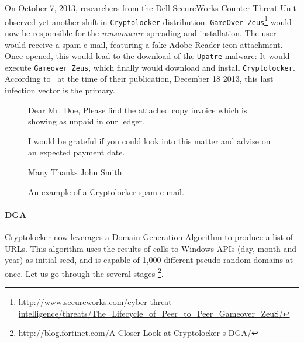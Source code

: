 On October 7, 2013, researchers from the Dell SecureWorks Counter Threat
Unit observed yet another shift in \texttt{Cryptolocker} distribution.
\texttt{GameOver Zeus}\footnote{\url{http://www.secureworks.com/cyber-threat-intelligence/threats/The_Lifecycle_of_Peer_to_Peer_Gameover_ZeuS/}} would now
be responsible for the \emph{ransomware} spreading and installation. The
user would receive a spam e-mail, featuring a fake Adobe Reader icon attachment.
Once opened, this would lead to the download of the \texttt{Upatre} malware:
It would execute \texttt{Gameover Zeus}, which finally would download and install
\texttt{Cryptolocker}.
According to~\cite{dell2013} at the time of their publication, December 18 2013,
this last infection vector is the primary.

\begin{figure}[!htp]
    \centering
    \begin{code}
Dear Mr. Doe,
Please find the attached copy invoice which is showing
as unpaid in our ledger.

I would be grateful if you could look into this matter
and advise on an expected payment date.

Many Thanks
John Smith
    \end{code}
    \caption{An example of a Cryptolocker spam e-mail.}
    \label{fig:spam_email}
\end{figure}

\paragraph{DGA} Cryptolocker now leverages a Domain Generation
Algorithm to produce a list of URLs. This algorithm uses the results of calls to
Windows APIs (day, month and year) as initial seed, and is capable of 1,000
different pseudo-random domains at once. Let us go through the several stages
\footnote{\url{http://blog.fortinet.com/A-Closer-Look-at-Cryptolocker-s-DGA/}}.

